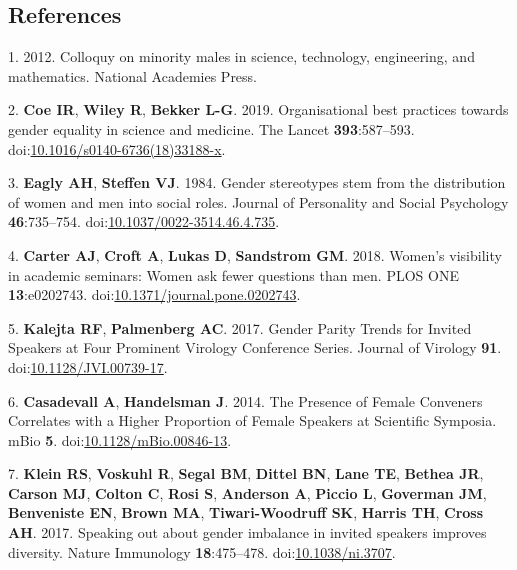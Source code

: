 \documentclass[10pt,]{article}
\begin{document}
\newpage

\subsection{References}\label{references}

\hypertarget{refs}{}
\hypertarget{ref-colloquy_2012}{}
1. 2012. Colloquy on minority males in science, technology, engineering,
and mathematics. National Academies Press.

\hypertarget{ref-Coe2019}{}
2. \textbf{Coe IR}, \textbf{Wiley R}, \textbf{Bekker L-G}. 2019.
Organisational best practices towards gender equality in science and
medicine. The Lancet \textbf{393}:587--593.
doi:\href{https://doi.org/10.1016/s0140-6736(18)33188-x}{10.1016/s0140-6736(18)33188-x}.

\hypertarget{ref-Eagly1984}{}
3. \textbf{Eagly AH}, \textbf{Steffen VJ}. 1984. Gender stereotypes stem
from the distribution of women and men into social roles. Journal of
Personality and Social Psychology \textbf{46}:735--754.
doi:\href{https://doi.org/10.1037/0022-3514.46.4.735}{10.1037/0022-3514.46.4.735}.

\hypertarget{ref-Carter2018}{}
4. \textbf{Carter AJ}, \textbf{Croft A}, \textbf{Lukas D},
\textbf{Sandstrom GM}. 2018. Women's visibility in academic seminars:
Women ask fewer questions than men. PLOS ONE \textbf{13}:e0202743.
doi:\href{https://doi.org/10.1371/journal.pone.0202743}{10.1371/journal.pone.0202743}.

\hypertarget{ref-kalejta_gender_2017}{}
5. \textbf{Kalejta RF}, \textbf{Palmenberg AC}. 2017. Gender Parity
Trends for Invited Speakers at Four Prominent Virology Conference
Series. Journal of Virology \textbf{91}.
doi:\href{https://doi.org/10.1128/JVI.00739-17}{10.1128/JVI.00739-17}.

\hypertarget{ref-casadevall_presence_2014}{}
6. \textbf{Casadevall A}, \textbf{Handelsman J}. 2014. The Presence of
Female Conveners Correlates with a Higher Proportion of Female Speakers
at Scientific Symposia. mBio \textbf{5}.
doi:\href{https://doi.org/10.1128/mBio.00846-13}{10.1128/mBio.00846-13}.

\hypertarget{ref-klein_speaking_2017}{}
7. \textbf{Klein RS}, \textbf{Voskuhl R}, \textbf{Segal BM},
\textbf{Dittel BN}, \textbf{Lane TE}, \textbf{Bethea JR}, \textbf{Carson
MJ}, \textbf{Colton C}, \textbf{Rosi S}, \textbf{Anderson A},
\textbf{Piccio L}, \textbf{Goverman JM}, \textbf{Benveniste EN},
\textbf{Brown MA}, \textbf{Tiwari-Woodruff SK}, \textbf{Harris TH},
\textbf{Cross AH}. 2017. Speaking out about gender imbalance in invited
speakers improves diversity. Nature Immunology \textbf{18}:475--478.
doi:\href{https://doi.org/10.1038/ni.3707}{10.1038/ni.3707}.
\end{document}
